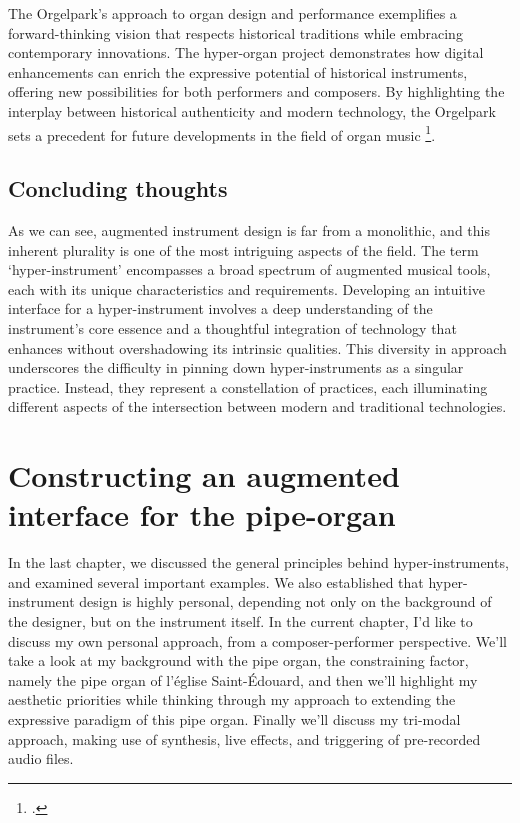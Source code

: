 \documentclass[12pt,twoside,maitrise]{dms_ks}
\theoremstyle{definition}
\begin{document}
{The Orgelpark's approach to organ design and performance exemplifies a forward-thinking vision that respects historical traditions while embracing contemporary innovations. 
The hyper-organ project demonstrates how digital enhancements can enrich the expressive potential of historical instruments, offering new possibilities for both performers and composers. 
By highlighting the interplay between historical authenticity and modern technology, the Orgelpark sets a precedent for future developments in the field of organ music \footcite[69]{fales_fusion_1994}.

\section{Concluding thoughts}

As we can see, augmented instrument design is far from a monolithic, and this inherent plurality is one of the most intriguing aspects of the field.
The term `hyper-instrument' encompasses a broad spectrum of augmented musical tools, each with its unique characteristics and requirements.
Developing an intuitive interface for a hyper-instrument involves a deep understanding of the instrument's core essence and a thoughtful integration of technology that enhances without overshadowing its intrinsic qualities.
This diversity in approach underscores the difficulty in pinning down hyper-instruments as a singular practice.
Instead, they represent a constellation of practices, each illuminating different aspects of the intersection between modern and traditional technologies.

\chapter{Constructing an augmented interface for the pipe-organ}

In the last chapter, we discussed the general principles behind hyper-instruments, and examined several important examples. 
We also established that hyper-instrument design is highly personal, depending not only on the background of the designer, but on the instrument itself. 
In the current chapter, I'd like to discuss my own personal approach, from a composer-performer perspective. We'll take a look at my background with the pipe organ, the constraining factor, namely the pipe organ of l'église Saint-Édouard, and then we'll highlight my aesthetic priorities while thinking through my approach to extending the expressive paradigm of this pipe organ. Finally we'll discuss my tri-modal approach, making use of synthesis, live effects, and triggering of pre-recorded audio files. 

}
\end{document}

